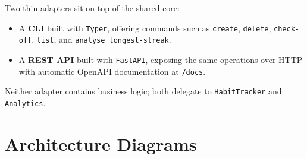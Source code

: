 \documentclass[11pt,a4paper]{article}
\begin{document}
Two thin adapters sit on top of the shared core:

\begin{itemize}
  \item A \textbf{CLI} built with \texttt{Typer}, offering commands such as
        \texttt{create}, \texttt{delete}, \texttt{check-off}, \texttt{list},
        and \texttt{analyse longest-streak}.
  \item A \textbf{REST API} built with \texttt{FastAPI}, exposing the same
        operations over HTTP with automatic OpenAPI documentation at
        \texttt{/docs}.
\end{itemize}

Neither adapter contains business logic; both delegate to
\texttt{HabitTracker} and \texttt{Analytics}.

\medskip
\noindent


\section{Architecture Diagrams}

\noindent
\end{document}
